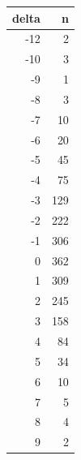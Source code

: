 \begin{tabular}{rr}
\toprule
delta & n \\
\midrule
-12 & 2 \\
-10 & 3 \\
-9 & 1 \\
-8 & 3 \\
-7 & 10 \\
-6 & 20 \\
-5 & 45 \\
-4 & 75 \\
-3 & 129 \\
-2 & 222 \\
-1 & 306 \\
0 & 362 \\
1 & 309 \\
2 & 245 \\
3 & 158 \\
4 & 84 \\
5 & 34 \\
6 & 10 \\
7 & 5 \\
8 & 4 \\
9 & 2 \\
\bottomrule
\end{tabular}
